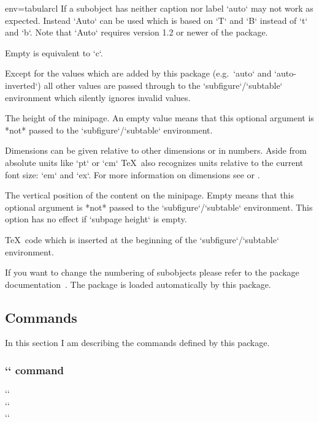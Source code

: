 \begin{tableobject}{env=tabular}{cl}
  If a subobject has neither caption nor label `auto` may not work as expected.
  Instead `Auto` can be used which is based on `T` and `B` instead of `t` and `b`.
  Note that `Auto` requires version 1.2 or newer of the  package.

  Empty is equivalent to `c`.

  Except for the values which are added by this package (e.g.\ `auto` and `auto-inverted`)
  all other values are passed through to the `subfigure`/`subtable` environment which silently ignores invalid values.


  The height of the minipage.
  An empty value means that this optional argument is
  *not* passed to the `subfigure`\slash `subtable` environment.

  Dimensions can be given relative to other dimensions or in numbers.
  Aside from absolute units like `pt` or `cm` \TeX\ also recognizes units relative to the current font size: `em` and `ex`.
  For more information on dimensions see  or .

  The vertical position of the content on the minipage.
  Empty means that this optional argument is
  *not* passed to the `subfigure`\slash `subtable` environment.
  This option has no effect if `subpage height` is empty.


  \TeX\ code which is inserted at the beginning of the `subfigure`\slash `subtable` environment.
\endkeydoc

If you want to change the numbering of subobjects please refer to the  package documentation~\autocite[section~5 ]{subcaption}.
The  package is loaded automatically by this package.
\endgroup


\subsection{Commands}
\label{commands}

In this section I am describing the commands defined by this package.


\subsubsection{`` command}
\label{includegraphicobject-command}
\begingroup
{}
`` \\
`` \\
``


\end{tableobject}
